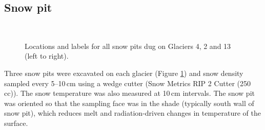 \documentclass{sfuthesis}
\begin{document}
\subsection{Snow pit}
\label{sec:snowpit}

\begin{figure}[H]
	\centering
	\\
	\caption{Locations and labels for all snow pits dug on Glaciers 4, 2 and 13 (left to right).}
	\label{fig:snowpit_location_all}
	\end{figure}

Three snow pits were excavated on each glacier (Figure \ref{fig:snowpit_location_all}) and snow density sampled every 5--10\,cm using a wedge cutter (Snow Metrics RIP 2 Cutter (250 cc)). The snow temperature was also measured at 10\,cm intervals. The snow pit was oriented so that the sampling face was in the shade (typically south wall of snow pit), which reduces melt and radiation-driven changes in temperature of the surface. 
\end{document}
